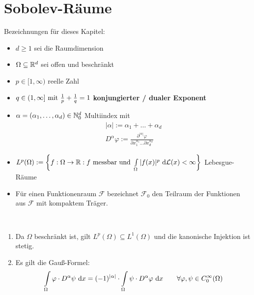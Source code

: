 
\section{Sobolev-Räume}
Bezeichnungen für dieses Kapitel:

\begin{itemize}
	\item $d\geq1$ sei die Raumdimension
	\item $\Omega\subseteq\R^d$ sei offen und beschränkt
	\item $p\in[1,\infty)$ reelle Zahl
	\item $q\in(1,\infty]\mit\frac{1}{p}+\frac{1}{q}=1$ \textbf{konjungierter / dualer Exponent}
	\item $\alpha=(\alpha_1,\ldots,\alpha_d)\in\N_0^d$ Multiindex mit
	\begin{align*}
		|\alpha|:=\alpha_1+\ldots+\alpha_d\\
		D^\alpha\varphi:=\frac{\partial^{|\alpha|}\varphi}{\partial x_1^{\alpha_1}\hdots\partial x_d^{\alpha_d}}
	\end{align*}
	\item $L^p(\Omega):=\left\lbrace f:\Omega\to\R:f\text{ messbar und }\int\limits_\Omega |f(x)|^p\d\mathcal{L}(x)<\infty\right\rbrace$ Lebesgue-Räume
	\item Für einen Funktionenraum $\mathcal{F}$ bezeichnet $\mathcal{F}_0$ den Teilraum der Funktionen aus $\mathcal{F}$ mit kompaktem Träger.
\end{itemize}

\begin{bemerkung}\
	\begin{enumerate}
		\item Da $\Omega$ beschränkt ist, gilt $L^p(\Omega)\subseteq L^1(\Omega)$ und die kanonische Injektion ist stetig.
		\item Es gilt die Gauß-Formel:
		\begin{align}\label{GaussFormel}
			\int\limits_\Omega\varphi\cdot D^\alpha\psi\d x=(-1)^{|\alpha|}\cdot\int\limits_\Omega\psi\cdot D^\alpha\varphi\d x\qquad\forall \varphi,\psi\in C_0^\infty(\Omega)
		\end{align}
	\end{enumerate}
\end{bemerkung}

